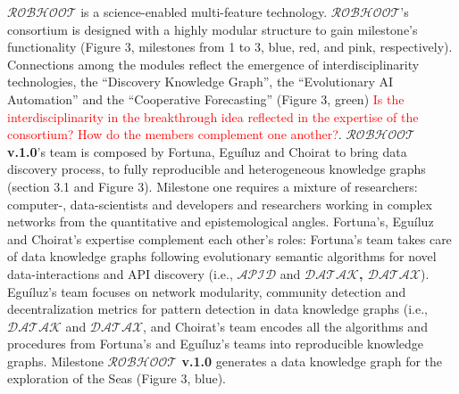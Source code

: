 \documentclass[11pt, a4paper]{article} %
\begin{document}
  {\bf $\mathcal{ROBHOOT}$} is a science-enabled multi-feature
  technology. $\mathcal{ROBHOOT}$'s consortium is designed with a
  highly modular structure to gain milestone's functionality (Figure
  3, milestones from 1 to 3, blue, red, and pink,
  respectively). Connections among the modules reflect the emergence
  of interdisciplinarity technologies, the ``Discovery Knowledge
  Graph'', the ``Evolutionary AI Automation'' and the ``Cooperative
  Forecasting'' (Figure 3, green) \textcolor{red}{Is the
    interdisciplinarity in the breakthrough idea reflected in the
    expertise of the consortium? How do the members complement one
    another?}. {\bf $\mathcal{ROBHOOT}$ v.1.0}'s team is composed by
  Fortuna, Egu\'iluz and Choirat to bring data discovery process, to
  fully reproducible and heterogeneous knowledge graphs (section 3.1
  and Figure 3). Milestone one requires a mixture of researchers:
  computer-, data-scientists and developers and researchers working in
  complex networks from the quantitative and epistemological
  angles. Fortuna's, Egu\'iluz and Choirat's expertise complement each
  other's roles: Fortuna's team takes care of data knowledge graphs
  following evolutionary semantic algorithms for novel
  data-interactions and API discovery (i.e., {\bf $\mathcal{APID}$}
  and {\bf $\mathcal{DATAK}$, $\mathcal{DATAX}$}). Egu\'iluz's team
  focuses on network modularity, community detection and
  decentralization metrics for pattern detection in data knowledge
  graphs (i.e., {\bf $\mathcal{DATAK}$} and {\bf $\mathcal{DATAX}$},
  and Choirat's team encodes all the algorithms and procedures from
  Fortuna's and Egu\'iluz's teams into reproducible knowledge
  graphs. Milestone {\bf $\mathcal{ROBHOOT}$ v.1.0} generates a data
  knowledge graph for the exploration of the Seas (Figure 3, blue).
\end{document}
